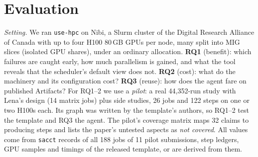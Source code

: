 \documentclass[10pt,conference]{IEEEtran}
\newcommand{\tool}{\texttt{use-hpc}}
\newcommand{\code}[1]{\texttt{#1}}
\begin{document}
\section{Evaluation}\label{sec:eval}

\emph{Setting.} We ran \tool{} on Nibi, a Slurm cluster of the Digital Research Alliance of Canada with up to four H100 80\,GB GPUs per node, many split into MIG slices (isolated GPU shares), under an ordinary allocation. \textbf{RQ1} (benefit): which failures are caught early, how much parallelism is gained, and what the tool reveals that the scheduler's default view does not. \textbf{RQ2} (cost): what do the machinery and its configuration cost? \textbf{RQ3} (reuse): how does the agent fare on published Artifacts? For RQ1--2 we use a \emph{pilot}: a real 44{,}352-run study with Lena's design (14 matrix jobs) plus side studies, 26 jobs and 122 steps on one or two H100s each. Its graph was written by the template's authors, so RQ1--2 test the template and RQ3 the agent. The pilot's coverage matrix maps 32 claims to producing steps and lists the paper's untested aspects as \emph{not covered}. All values come from \code{sacct} records of all 188 jobs of 11 pilot submissions, step ledgers, GPU samples and timings of the released template, or are derived from them.
\end{document}
